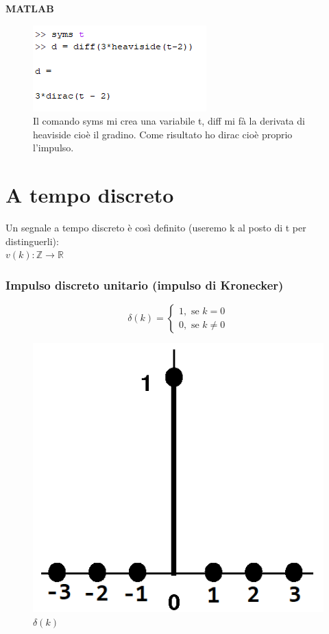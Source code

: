 \pagebreak

	\textbf{MATLAB}\\

	\begin{figure}[h]
		\centering
		\includegraphics{immagini/comando3}
		\caption{Il comando syms mi crea una variabile t, diff mi fà la derivata di heaviside cioè il gradino. Come risultato ho dirac cioè proprio l'impulso.  }
		\label{fig: comando3}
	\end{figure}

\section{A tempo discreto}

Un segnale a tempo discreto è così definito (useremo k al posto di t per distinguerli):\\
$ v(k): \mathbb{Z} \rightarrow \mathbb{R} $

\subsubsection{Impulso discreto unitario (impulso di Kronecker)}

	\begin{equation*}
	\delta(k)=
	\begin{cases} 
	1, \mbox{ se } k=0 \\
	0, \mbox{ se } k \neq 0
	\end{cases} 
	\end{equation*}

	\begin{figure}[h]
	\centering
	\includegraphics[scale=0.5]{immagini/impulsoDiscreto}
	\caption{ $ \delta(k)$ }
	\label{fig: impulsoDiscreto}
	\end{figure}

